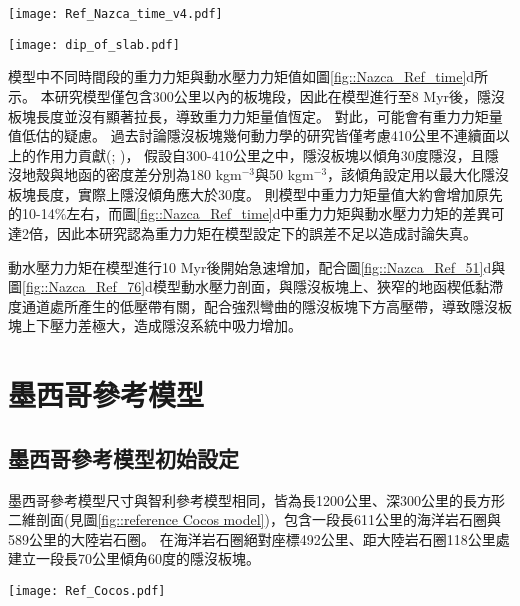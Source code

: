 \begin{figure*}[ht!]
    \centering
    \texttt{[image: Ref\_Nazca\_time\_v4.pdf]}
    \caption[智利參考模型隱沒板塊狀態隨時間變化]{智利參考模型隱沒板塊狀態隨時間變化，灰色底標出平坦隱沒發育後時間段。(a)參考模型平坦長度隨時間變化。(b)參考模型平坦深度隨時間變化，灰虛線為\citet{Manea2017}中提及之智利平坦隱沒平坦深度約落在100公里深。(c)參考模型隱沒板塊自海溝到深度150公里之傾角，傾角值有做1 Myr的移動平均。(d)參考模型中重力力矩與動水壓力力矩隨時間變化。其中粉紅色線為重力力矩，深藍色線為動水壓力力矩。兩者皆有做1 Myr的移動平均。}
    \label{fig::Nazca_Ref_time}
\end{figure*}

\begin{figure*}[h]
    \centering
    \texttt{[image: dip\_of\_slab.pdf]}
    \caption[本研究中隱沒傾角的計算方式]{本研究中隱沒傾角的計算方式。}
    \label{fig::dip_of_slab}
\end{figure*}

模型中不同時間段的重力力矩與動水壓力力矩值如圖\ref{fig::Nazca_Ref_time}d所示。
本研究模型僅包含300公里以內的板塊段，因此在模型進行至8 Myr後，隱沒板塊長度並沒有顯著拉長，導致重力力矩量值恆定。
對此，可能會有重力力矩量值低估的疑慮。
過去討論隱沒板塊幾何動力學的研究皆僅考慮410公里不連續面以上的作用力貢獻(\citealp{schellart2004quantifying}; \citealp{billen2008modeling})，
假設自300-410公里之中，隱沒板塊以傾角30度隱沒，且隱沒地殼與地函的密度差分別為180 kgm$^{-3}$與50 kgm$^{-3}$，該傾角設定用以最大化隱沒板塊長度，實際上隱沒傾角應大於30度。
則模型中重力力矩量值大約會增加原先的10-14$\%$左右，而圖\ref{fig::Nazca_Ref_time}d中重力力矩與動水壓力力矩的差異可達2倍，因此本研究認為重力力矩在模型設定下的誤差不足以造成討論失真。

動水壓力力矩在模型進行10 Myr後開始急速增加，配合圖\ref{fig::Nazca_Ref_51}d與圖\ref{fig::Nazca_Ref_76}d模型動水壓力剖面，與隱沒板塊上、狹窄的地函楔低黏滯度通道處所產生的低壓帶有關，配合強烈彎曲的隱沒板塊下方高壓帶，導致隱沒板塊上下壓力差極大，造成隱沒系統中吸力增加。

\newpage
\section{墨西哥參考模型}
\subsection{墨西哥參考模型初始設定}
墨西哥參考模型尺寸與智利參考模型相同，皆為長1200公里、深300公里的長方形二維剖面(見圖\ref{fig::reference Cocos model})，包含一段長611公里的海洋岩石圈與589公里的大陸岩石圈。
在海洋岩石圈絕對座標492公里、距大陸岩石圈118公里處建立一段長70公里傾角60度的隱沒板塊。
\begin{figure*}[ht!]
    \centering
    \texttt{[image: Ref\_Cocos.pdf]}
    \caption[墨西哥參考模型設計與邊界條件示意圖]{墨西哥參考模型設計與邊界條件示意圖}
    \label{fig::reference Cocos model}
\end{figure*}

